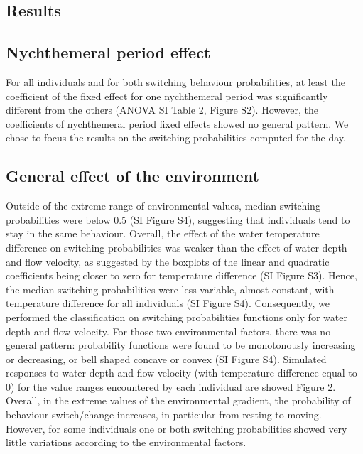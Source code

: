 \documentclass{article}
\begin{document}
\begin{linenumbers}
\section{Results}
\subsection{Nychthemeral period effect}
For all individuals and for both switching behaviour probabilities, at least the coefficient of the fixed effect for one nychthemeral period was significantly different from the others (ANOVA SI Table 2, Figure S2). However, the coefficients of nychthemeral period fixed effects showed no general pattern. We chose to focus the results on the switching probabilities computed for the day.


\subsection{General effect of the environment}
Outside of the extreme range of environmental values, median switching probabilities were below 0.5 (SI Figure S4), suggesting that individuals tend to stay in the same behaviour. Overall, the effect of the water temperature difference on switching probabilities was weaker than the effect of water depth and flow velocity, as suggested by the boxplots of the linear and quadratic coefficients being closer to zero for temperature difference (SI Figure S3). Hence, the median switching probabilities were less variable, almost constant, with temperature difference for all individuals (SI Figure S4). Consequently, we performed the classification on switching probabilities functions only for water depth and flow velocity. For those two environmental factors, there was no general pattern: probability functions were found to be monotonously increasing or decreasing, or bell shaped concave or convex (SI Figure S4). Simulated responses to water depth and flow velocity (with temperature difference equal to 0) for the value ranges encountered by each individual are showed Figure 2. Overall, in the extreme values of the environmental gradient, the probability of behaviour switch/change increases, in particular from resting to moving. However, for some individuals one or both switching probabilities showed very little variations according to the environmental factors.


\end{linenumbers}
\end{document}
